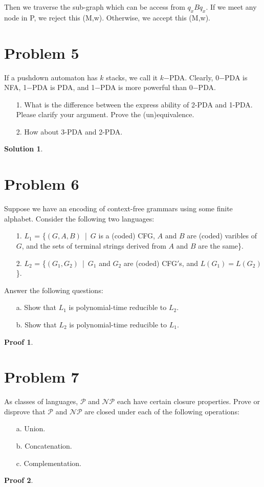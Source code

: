 \documentclass[a4paper,UTF8]{ctexart}
\theoremstyle{definition}
\newtheorem*{solution}{Solution}
\newtheorem*{prove}{Proof}
\begin{document}
Then we traverse the sub-graph which can be access from $q_xBq_x$. If we meet any node in P,
we reject this (M,w). Otherwise, we accept this (M,w).

\newpage

\section*{Problem 5}
If a pushdown automaton has $k$ stacks, we call it $k$−PDA. Clearly, 0−PDA is NFA, 1−PDA is PDA, and 1−PDA is more powerful than 0−PDA.
\begin{enumerate}
  \item[1.] What is the difference between the express ability of 2-PDA and 1-PDA. Please clarify your argument. Prove the (un)equivalence.
  \item[2.] How about 3-PDA and 2-PDA.
\end{enumerate}
\begin{solution}
\end{solution}
\newpage

\section*{Problem 6}
Suppose we have an encoding of context-free grammars using some finite alphabet. Consider the following two languages:
\begin{enumerate}
  \item[1.] $L_1$ = \big\{$(G,A,B)$\ |\ $G$ is a (coded) CFG, $A$ and $B$ are (coded) varibles of $G$, and the sets of terminal strings derived from $A$ and $B$ are the same\big\}.
  \item[2.] $L_2$ = \big\{$(G_1,G_2)$\ |\ $G_1$ and $G_2$ are (coded) CFG$'$s, and $L(G_1) = L(G_2)$\big\}.
\end{enumerate}
Answer the following questions:
\begin{enumerate}
  \item[a.] Show that $L_1$ is polynomial-time reducible to $L_2$.
  \item[b.] Show that $L_2$ is polynomial-time reducible to $L_1$.
\end{enumerate}
\begin{prove}
\end{prove}
\newpage

\section*{Problem 7}
As classes of languages, $\mathcal{P}$ and $\mathcal{NP}$ each have certain closure properties. Prove or disprove that $\mathcal{P}$ and $\mathcal{NP}$ are closed under each of the following operations:
\begin{enumerate}
  \item[a.] Union.
  \item[b.] Concatenation.
  \item[c.] Complementation.
\end{enumerate}
\begin{prove}
\end{prove}
\end{document}
